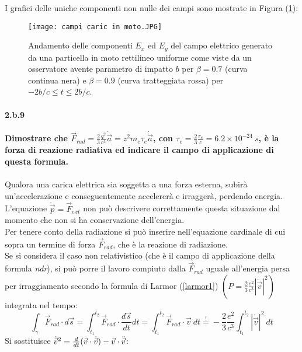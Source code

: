 \documentclass[twoside]{article}
\begin{document}
I grafici delle uniche componenti non nulle dei campi sono mostrate in Figura (\ref{carica moto}):


\begin{figure}[H]
    \centering
    \texttt{[image: campi caric in moto.JPG]}
    \label{carica moto}
    \caption{Andamento delle componenti $E_x$ ed $E_y$ del campo elettrico generato da una particella in
moto rettilineo uniforme come viste da un osservatore avente parametro di impatto $b$ per $\beta = 0.7$
(curva continua nera) e $\beta = 0.9$ (curva tratteggiata rossa) per $-2b/c \le t \le 2b/c$.}
\end{figure}



\paragraph{2.b.9} 
\textbf{Dimostrare che $\vec{F}_{rad}=\frac{2}{3}\frac{q^2}{c^3}\dot{\vec{a}}=z^2m_e \tau_e \dot{\vec{a}}$, con $\tau_e=\frac{2}{3}\frac{r_e}{c}=6.2\times 10^{-24} \ s$, è la forza di reazione
radiativa ed indicare il campo di applicazione di questa formula.}\\ \\
Qualora una carica elettrica sia soggetta a una forza esterna, subirà un'accelerazione e conseguentemente accelererà e irraggerà, perdendo energia.
\\
L'equazione $\dot{\vec{p}}=\vec{F}_{ext}$ non può descrivere correttamente questa situazione dal momento che non si ha conservazione dell'energia.
\\
Per tenere conto della radiazione si può inserire nell'equazione cardinale di cui sopra un termine di forza $\vec{F}_{rad}$, che è la reazione di radiazione.
\\
Se si considera il caso non relativistico (che è il campo di applicazione della formula \textit{ndr}), si può porre il lavoro compiuto dalla $\vec{F}_{rad}$ uguale all'energia persa per irraggiamento secondo la formula di Larmor (\ref{larmor1}) $\left(P=\frac{2}{3}\frac{e^2}{c^3}|\dot{\vec{v}}|^2 \right)$ integrata nel tempo:
\begin{equation}
    \int_{\gamma}\vec{F}_{rad}\cdot d\vec{s}=\int_{t_1}^{t_2}\vec{F}_{rad}\cdot \frac{d\vec{s}}{dt}dt=\int_{t_1}^{t_2}\vec{F}_{rad}\cdot\vec{v}\ dt\overset{!}{=}-\frac{2}{3}\frac{e^2}{c^3}\int_{t_1}^{t_2}|\dot{\vec{v}}|^2 \ dt
\end{equation}
Si sostituisce $\dot{\vec{v}}^2=\frac{d}{dt}(\vec{v}\cdot \dot{\vec{v}})-\vec{v}\cdot \Ddot{\vec{v}}$:
\end{document}
